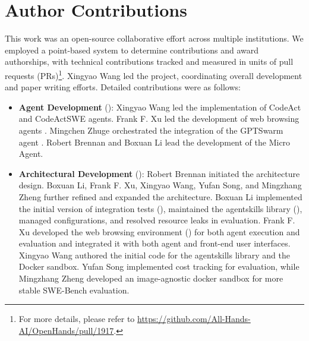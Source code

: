 \newpage

\section*{Author Contributions}
This work was an open-source collaborative effort across multiple institutions. We employed a point-based system to determine contributions and award authorships, with technical contributions tracked and measured in units of pull requests (PRs)\footnote{For more details, please refer to \url{https://github.com/All-Hands-AI/OpenHands/pull/1917}.}. Xingyao Wang led the project, coordinating overall development and paper writing efforts. Detailed contributions were as follows:

\begin{itemize}[noitemsep,topsep=0pt,parsep=2pt,partopsep=0pt,leftmargin=18pt]

\item \textbf{Agent Development} (): Xingyao Wang led the implementation of CodeAct \cite{wang2024executable} and CodeActSWE agents. Frank F. Xu led the development of web browsing agents \cite{zhou2023webarena}. Mingchen Zhuge orchestrated the integration of the GPTSwarm agent \cite{zhuge2024language}. Robert Brennan and Boxuan Li lead the development of the Micro Agent.

\item \textbf{Architectural Development} (): Robert Brennan initiated the architecture design. Boxuan Li, Frank F. Xu, Xingyao Wang, Yufan Song, and Mingzhang Zheng further refined and expanded the architecture. Boxuan Li implemented the initial version of integration tests (), maintained the agentskills library (), managed configurations, and resolved resource leaks in evaluation. Frank F. Xu developed the web browsing environment () for both agent execution and evaluation and integrated it with both agent and front-end user interfaces. Xingyao Wang authored the initial code for the agentskills library and the Docker sandbox. Yufan Song implemented cost tracking for evaluation, while Mingzhang Zheng developed an image-agnostic docker sandbox for more stable SWE-Bench evaluation.


\end{itemize}
